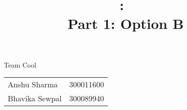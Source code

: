 \documentclass{article}
\title{
\vspace{2in}
\textmd{\textbf{\hmwkClass:\ \hmwkTitle}}\\[5pt]
\normalsize{Part 1: Option B}\\
\vspace{0.1in}
\vspace{3in}
}
\newcommand{\hmwkAuthorName}{Team Cool} %
\begin{document}
\maketitle
\begin{center}
\hmwkAuthorName\\[3pt]
\begin{tabular}{ll}
Anshu Sharma & 300011600 \\
Bhavika Sewpal & 300089940 \\
\end{tabular} 
\end{center}
\clearpage

\end{document}
